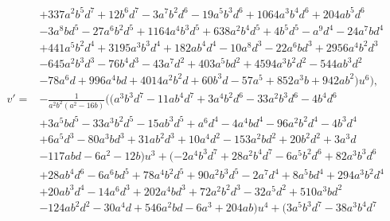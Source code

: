 \documentclass[microtype]{gtpart}     %
\theoremstyle{remark}
\theoremstyle{definition}
\begin{document}
\begin{equation*}
\begin{split}
      & + 337 a^2 b^5 d^7 + 12 b^6 d^7 - 3 a^7 b^2 d^6 - 19 a^5 b^3 d^6 + 1064 a^3 b^4 d^6 + 204 a b^5 d^6 \\
      & - 3 a^8 b d^5 - 27 a^6 b^2 d^5 + 1164 a^4 b^3 d^5 + 638 a^2 b^4 d^5 + 4 b^5 d^5 - a^9 d^4 - 24 a^7 b d^4 \\
      & + 441 a^5 b^2 d^4 + 3195 a^3 b^3 d^4 + 182 a b^4 d^4 - 10 a^8 d^3 - 22 a^6 b d^3 + 2956 a^4 b^2 d^3 \\
      & - 645 a^2 b^3 d^3 - 76 b^4 d^3 - 43 a^7 d^2 + 403 a^5 b d^2 + 4594 a^3 b^2 d^2 - 544 a b^3 d^2 \\
      & - 78 a^6 d + 996 a^4 b d + 4014 a^2 b^2 d + 60 b^3 d - 57 a^5 + 852 a^3 b + 942 a b^2) u^6 \big), \\
~v' = & -\frac{1}{a^2 b^2 (a^2 - 16 b)} \big( (a^3 b^3 d^7 - 11 a b^4 d^7 + 3 a^4 b^2 d^6 - 33 a^2 b^3 d^6 - 4 b^4 d^6 \\
      & + 3 a^5 b d^5 - 33 a^3 b^2 d^5 - 15 a b^3 d^5 + a^6 d^4 - 4 a^4 b d^4 - 96 a^2 b^2 d^4 - 4 b^3 d^4 \\
      & + 6 a^5 d^3 - 80 a^3 b d^3 + 31 a b^2 d^3 + 10 a^4 d^2 - 153 a^2 b d^2 + 20 b^2 d^2 + 3 a^3 d \\
      & - 117 a b d - 6 a^2 - 12 b) u^3 + (-2 a^4 b^3 d^7 + 28 a^2 b^4 d^7 - 6 a^5 b^2 d^6 + 82 a^3 b^3 d^6 \\
      & + 28 a b^4 d^6 - 6 a^6 b d^5 + 78 a^4 b^2 d^5 + 90 a^2 b^3 d^5 - 2 a^7 d^4 + 8 a^5 b d^4 + 294 a^3 b^2 d^4 \\
      & + 20 a b^3 d^4 - 14 a^6 d^3 + 202 a^4 b d^3 + 72 a^2 b^2 d^3 - 32 a^5 d^2 + 510 a^3 b d^2 \\
      & - 124 a b^2 d^2 - 30 a^4 d + 546 a^2 b d - 6 a^3 + 204 a b) u^4 + (3 a^5 b^3 d^7 - 38 a^3 b^4 d^7 
\end{split}
\end{equation*}
\end{document}
